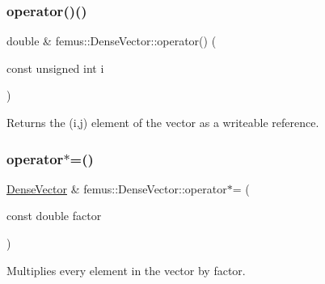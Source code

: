 \subsubsection{\texorpdfstring{operator()()}{operator()()}\hspace{0.1cm}{\footnotesize\ttfamily [2/2]}}
{\footnotesize\ttfamily double \& femus\+::\+Dense\+Vector\+::operator() (\begin{DoxyParamCaption}\item[{const unsigned int}]{i }\end{DoxyParamCaption})\hspace{0.3cm}{\ttfamily [inline]}}


\begin{DoxyItemize}
\item \begin{DoxyReturn}{Returns}
the {\ttfamily }(i,j) element of the vector as a writeable reference. 
\end{DoxyReturn}

\end{DoxyItemize}\mbox{\label{classfemus_1_1_dense_vector_aa332a79a955cacb506546a7ca0d00894}} 
\subsubsection{\texorpdfstring{operator$\ast$=()}{operator*=()}}
{\footnotesize\ttfamily \mbox{\hyperlink{classfemus_1_1_dense_vector}{Dense\+Vector}} \& femus\+::\+Dense\+Vector\+::operator$\ast$= (\begin{DoxyParamCaption}\item[{const double}]{factor }\end{DoxyParamCaption})\hspace{0.3cm}{\ttfamily [inline]}}


\begin{DoxyItemize}
\item Multiplies every element in the vector by {\ttfamily factor}. 
\end{DoxyItemize}\mbox{\label{classfemus_1_1_dense_vector_ac4db2e76d3e4750f8585d6ed03ef2800}} 

